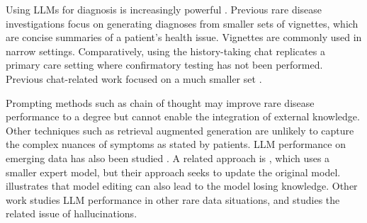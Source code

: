 Using LLMs for diagnosis is increasingly powerful \cite{generalistMedicalLangaugeModel, Rutledge2024DiagnosticAO,zhou2024largelanguagemodelsdisease,tu2024conversationaldiagnosticai}.  Previous rare disease investigations \cite{hu2023can,shyr2024identifying,sandmann2024systematic,chen2024rarebench,yang2024rdguru,mehnen2023chatgpt,shyr2024identifying,Olmo2024AssessingDD} focus on generating diagnoses from smaller sets of vignettes, which are concise summaries of a patient's health issue. Vignettes are commonly used in narrow settings.  Comparatively, using the history-taking chat replicates a primary care setting where confirmatory testing has not been performed. Previous chat-related work focused on a much smaller set \cite{yang2024rdmaster}. 

Prompting methods such as chain of thought \cite{wei2022cot} may improve rare disease performance to a degree but cannot enable the integration of external knowledge.  Other techniques such as retrieval augmented generation \cite{lewis2020rag} are unlikely to capture the complex nuances of symptoms as stated by patients. LLM performance on emerging data has also been studied \cite{mitchell2021fast,gu2024model}.  A related approach is \citet{yao2024scalable}, which uses a smaller expert model, but their approach seeks to update the original model.  \cite{gupta-etal-2024-model} illustrates that model editing can also lead to the model losing knowledge.  Other work \cite{zhao2024wildhallucinations} studies LLM performance in other rare data situations, and studies the related issue of  hallucinations\cite{fabbri-etal-2022-qafacteval,min-etal-2023-factscore}. 
